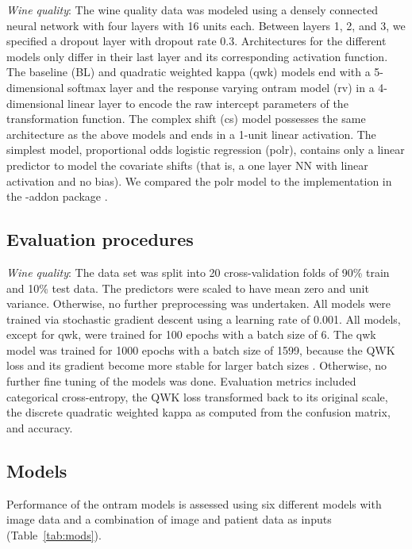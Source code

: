 \documentclass[article,nojss,shortnames]{jss}\usepackage[]{graphicx}\usepackage[]{color}
\begin{document}
\emph{Wine quality}: The wine quality data was modeled using a densely connected
neural network with four layers with 16 units each. Between layers 1, 2, and 3, we
specified a dropout layer with dropout rate 0.3. Architectures for the different
models only differ in their last layer and its corresponding activation function.
The baseline (BL) and quadratic weighted kappa (qwk) models end with a 5-dimensional
softmax layer and the response varying ontram model (rv) in a 4-dimensional linear
layer to encode the raw intercept parameters of the transformation function.
The complex shift (cs) model possesses the same architecture as the above models
and ends in a 1-unit linear activation.
The simplest model, proportional odds logistic regression (polr), contains only a
linear predictor to model the covariate shifts (that is, a one layer NN with linear
activation and no bias). We compared the polr model to the implementation in the
-addon package  \citep{pkg:tram}.

\subsection{Evaluation procedures}

\emph{Wine quality}:
The data set was split into 20 cross-validation folds of 90\% train and 10\% test data.
The predictors were scaled to have mean zero and unit variance.
Otherwise, no further preprocessing was undertaken.
All models were trained via stochastic gradient descent using a learning rate of
0.001.
All models, except for qwk, were trained for 100 epochs with a batch size of 6.
The qwk model was trained for 1000 epochs with a batch size of 1599, because the
QWK loss and its gradient become more stable for larger batch sizes \citep{de2018weighted}.
Otherwise, no further fine tuning of the models was done.
Evaluation metrics included categorical cross-entropy, the QWK loss transformed
back to its original scale, the discrete quadratic weighted kappa as computed from
the confusion matrix, and accuracy.

\subsection{Models}

Performance of the ontram models is assessed using six different models with
image data and a combination of image and patient data as inputs (Table~\ref{tab:mods}).
\end{document}
